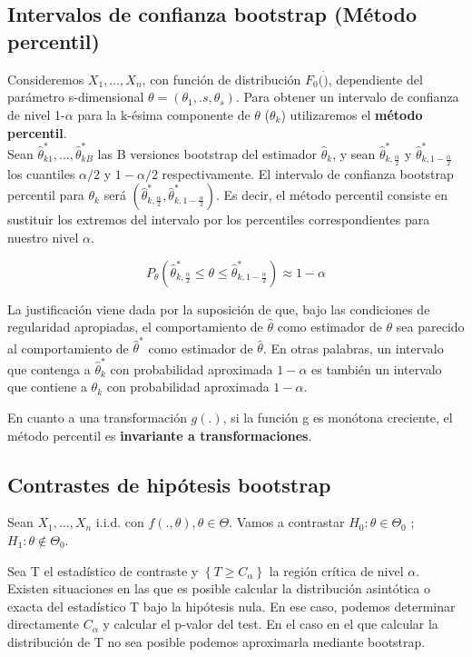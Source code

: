 \subsection{Intervalos de confianza bootstrap (Método percentil)}
Consideremos $X_1,\dots,X_n$, con función de distribución $F_0(\dot)$, dependiente del parámetro s-dimensional $\theta=(\theta_1,.s,\theta_s)$. Para obtener un intervalo de confianza de nivel 1-$\alpha$ para la k-ésima componente de $\theta$ ($\theta_k$) utilizaremos el \textbf{método percentil}.\\

Sean $\hat\theta_{k1}^*,\dots,\hat\theta_{kB}^*$ las B versiones bootstrap del estimador $\hat\theta_k$, y sean $\hat\theta^*_{k,\frac{\alpha}{2}}$ y $\hat\theta^*_{k,1-\frac{\alpha}{2}}$ los cuantiles $\alpha/2$ y $1-\alpha/2$ respectivamente.
El intervalo de confianza bootstrap percentil para $\theta_k$ será $\left(\hat\theta^*_{k,\frac{\alpha}{2}},\hat\theta^*_{k,1-\frac{\alpha}{2}} \right)$. Es decir, el método percentil consiste en sustituir los extremos del intervalo por los percentiles correspondientes para nuestro nivel $\alpha$.

$$P_\theta\left(\hat\theta^*_{k,\frac{\alpha}{2}}\leq\theta\leq\hat\theta^*_{k,1-\frac{\alpha}{2}}\right)\approx 1-\alpha$$

La justificación viene dada por la suposición de que, bajo las condiciones de regularidad apropiadas, el comportamiento de $\hat\theta$ como estimador de $\theta$ sea parecido al comportamiento de $\hat\theta^*$ como estimador de $\hat\theta$.
En otras palabras, un intervalo que contenga a $\hat\theta^*_{k}$ con probabilidad aproximada $1-\alpha$ es también un intervalo que contiene a $\theta_k$ con probabilidad aproximada $1-\alpha$.

En cuanto a una transformación $g(.)$, si la función g es monótona creciente, el método percentil es \textbf{invariante a transformaciones}.

\subsection{Contrastes de hipótesis bootstrap}

Sean $X_1,\dots,X_n$ i.i.d. con $f(.,\theta), \theta\in\Theta$. Vamos a contrastar $H_0: \theta\in\Theta_0$ ; $H_1:\theta\notin\Theta_0$.

Sea T el estadístico de contraste y $\left\{T \geq C_\alpha\right\}$ la región crítica de nivel $\alpha$. Existen situaciones en las que es posible calcular la distribución asintótica o exacta del estadístico T bajo la hipótesis nula.
En ese caso, podemos determinar directamente $C_\alpha$ y calcular el p-valor del test. En el caso en el que calcular la distribución de T no sea posible podemos aproximarla mediante bootstrap.

